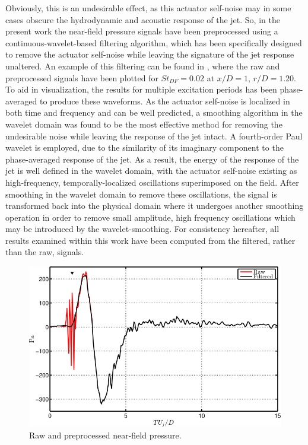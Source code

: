 Obviously, this is an undesirable effect, as this actuator self-noise may in some cases obscure the hydrodynamic and acoustic response of the jet.
So, in the present work the near-field pressure signals have been preprocessed using a continuous-wavelet-based filtering algorithm, which has been specifically designed to remove the actuator self-noise while leaving the signature of the jet response unaltered. 
An example of this filtering can be found in , where the raw and preprocessed signals have been plotted for $St_{DF} = 0.02$ at $x/D = 1$, $r/D = 1.20$. 
To aid in visualization, the results for multiple excitation periods has been phase-averaged to produce these waveforms. 
As the actuator self-noise is localized in both time and frequency and can be well predicted, a smoothing algorithm in the wavelet domain was found to be the most effective method for removing the undesirable noise while leaving the response of the jet intact. 
A fourth-order Paul wavelet is employed, due to the similarity of its imaginary component to the phase-averaged response of the jet. 
As a result, the energy of the response of the jet is well defined in the wavelet domain, with the actuator self-noise existing as high-frequency, temporally-localized oscillations superimposed on the field. 
After smoothing in the wavelet domain to remove these oscillations, the signal is transformed back into the physical domain where it undergoes another smoothing operation in order to remove small amplitude, high frequency oscillations which may be introduced by the wavelet-smoothing. 
For consistency hereafter, all results examined within this work have been computed from the filtered, rather than the raw, signals.
\begin{figure}
	\centering
	\includegraphics{Figures/NearField_Preprocessing_Filtering.png}
	\caption{Raw and preprocessed near-field pressure.}
	\label{fig:preprocessing:wavelet_filter}
\end{figure} 

